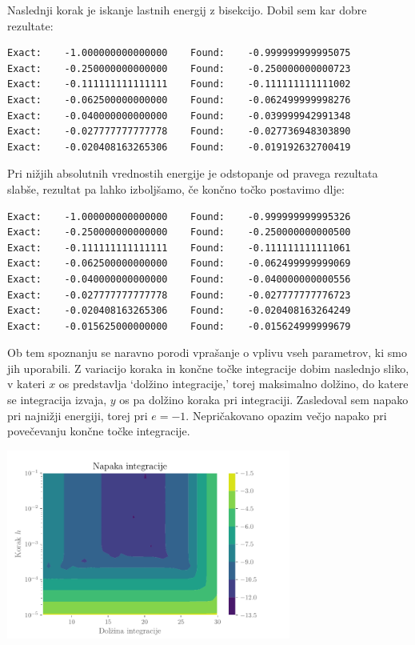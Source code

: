 \documentclass[a4paper,oneside,12pt]{article}
\begin{document}
Naslednji korak je iskanje lastnih energij z bisekcijo. Dobil sem kar dobre rezultate:
\begin{center}
\begin{verbatim}
Exact:	  -1.000000000000000 	Found:	  -0.999999999995075
Exact:	  -0.250000000000000 	Found:	  -0.250000000000723
Exact:	  -0.111111111111111 	Found:	  -0.111111111111002
Exact:	  -0.062500000000000 	Found:	  -0.062499999998276
Exact:	  -0.040000000000000 	Found:	  -0.039999942991348
Exact:	  -0.027777777777778 	Found:	  -0.027736948303890
Exact:	  -0.020408163265306 	Found:	  -0.019192632700419
\end{verbatim}
\end{center}
Pri nižjih absolutnih vrednostih energije je odstopanje od pravega rezultata slabše, rezultat pa lahko izboljšamo, če končno točko postavimo dlje:
\begin{center}
\begin{verbatim}
Exact:	  -1.000000000000000 	Found:	  -0.999999999995326
Exact:	  -0.250000000000000 	Found:	  -0.250000000000500
Exact:	  -0.111111111111111 	Found:	  -0.111111111111061
Exact:	  -0.062500000000000 	Found:	  -0.062499999999069
Exact:	  -0.040000000000000 	Found:	  -0.040000000000556
Exact:	  -0.027777777777778 	Found:	  -0.027777777776723
Exact:	  -0.020408163265306 	Found:	  -0.020408163264249
Exact:	  -0.015625000000000 	Found:	  -0.015624999999679
\end{verbatim}
\end{center}
Ob tem spoznanju se naravno porodi vprašanje o vplivu vseh parametrov, ki smo jih uporabili. Z variacijo koraka in končne točke integracije dobim naslednjo sliko, v kateri $x$ os predstavlja `dolžino integracije,' torej maksimalno dolžino, do katere se integracija izvaja, $y$ os pa dolžino koraka pri integraciji. Zasledoval sem napako pri najnižji energiji, torej pri $e=-1$. Nepričakovano opazim večjo napako pri povečevanju končne točke integracije.

\begin{center}
     \includegraphics[width=0.7\textwidth]{../old/2020_1-napaka_integracije.pdf}
\end{center}
\end{document}
